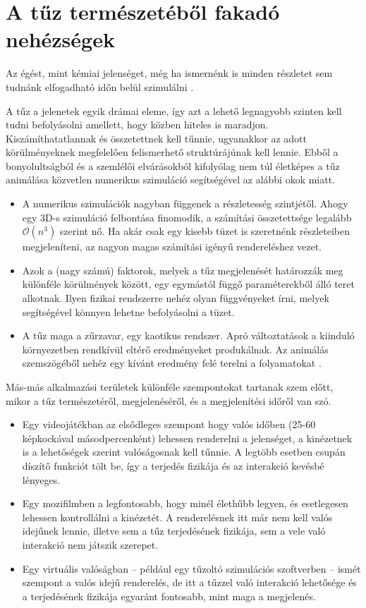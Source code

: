 \section{A tűz természetéből fakadó nehézségek}

Az égést, mint kémiai jelenséget, még ha ismernénk is minden részletet sem tudnánk elfogadható időn belül szimulálni  \cite{firestarter}.

A tűz a jelenetek egyik drámai eleme, így azt a lehető legnagyobb szinten kell tudni befolyásolni amellett, hogy közben hiteles is maradjon. Kiszámíthatatlannak és összetettnek kell tűnnie, ugyanakkor az adott körülményeknek megfelelően felismerhető struktúrájúnak kell lennie. Ebből a bonyolultságból és a szemlélői elvárásokból kifolyólag nem túl életképes a tűz animálása közvetlen numerikus szimuláció segítségével az alábbi okok miatt.
\begin{itemize}
\item
A numerikus szimulációk nagyban függenek a részletesség szintjétől. Ahogy egy 3D-s szimuláció felbontása finomodik, a számítási összetettsége legalább $\mathcal{O}(n^3)$ szerint nő. Ha akár csak egy kisebb tüzet is szeretnénk részleteiben megjeleníteni, az nagyon magas számítási igényű rendereléshez vezet.
\item
Azok a (nagy számú) faktorok, melyek a tűz megjelenését határozzák meg különféle körülmények között, egy egymástól függő paraméterekből álló teret alkotnak. Ilyen fizikai rendszerre nehéz olyan függvényeket írni, melyek segítségével könnyen lehetne befolyásolni a tüzet. 
\item
A tűz maga a zűrzavar, egy kaotikus rendszer. Apró változtatások a kiinduló környezetben rendkívül eltérő eredményeket produkálnak. Az animálás szemszögéből nehéz egy kívánt eredmény felé terelni a folyamatokat \cite{ArNiStructuralModeling}.
\end{itemize}

Más-más alkalmazási területek különféle szempontokat tartanak szem előtt, mikor a tűz természetéről, megjelenéséről, és a megjelenítési időről van szó.

\begin{itemize}
\item
Egy videojátékban az elsődleges szempont hogy valós időben (25-60 képkockával másodpercenként) lehessen renderelni a jelenséget, a kinézetnek is a lehetőségek szerint valóságosnak kell tűnnie. A legtöbb esetben csupán díszítő funkciót tölt be, így a terjedés fizikája és az interakció kevésbé lényeges.
\item
Egy mozifilmben a legfontosabb, hogy minél élethűbb legyen, és esetlegesen lehessen kontrollálni a kinézetét. A renderelésnek itt már nem kell valós idejűnek lennie, illetve sem a tűz terjedésének fizikája, sem a vele való interakció nem játszik szerepet.
\item
Egy virtuális valóságban -- például egy tűzoltó szimulációs szoftverben -- ismét szempont a valós idejű renderelés, de itt a tűzzel való interakció lehetősége és a terjedésének fizikája egyaránt fontosabb, mint maga a megjelenés.
\end{itemize}
